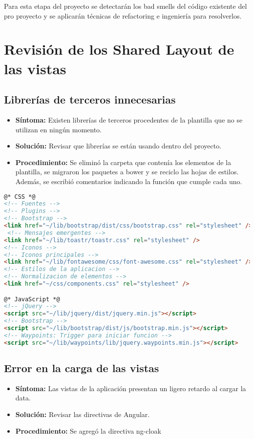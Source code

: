 Para esta etapa del proyecto se detectarán los bad smells del código existente del pro proyecto y se aplicarán técnicas de refactoring e ingeniería para resolverlos.

\section{Revisión de los Shared Layout de las vistas}
\subsection{Librerías de terceros innecesarias}
\begin{itemize}
	\item \textbf{Síntoma:} Existen librerías de terceros procedentes de la plantilla que no se utilizan en ningún momento.
	\item \textbf{Solución:} Revisar que librerías se están usando dentro del proyecto. 
	\item \textbf{Procedimiento:} Se eliminó la carpeta que contenía los elementos de la plantilla, se migraron los paquetes a bower y se reciclo las hojas de estilos. Además, se escribió comentarios indicando la función que cumple cada uno.
\end{itemize}

\begin{lstlisting}[language=html]
@* CSS *@
<!-- Fuentes -->
<!-- Plugins -->
<!-- Bootstrap -->
<link href="~/lib/bootstrap/dist/css/bootstrap.css" rel="stylesheet" /> 
 <!-- Mensajes emergentes -->
<link href="~/lib/toastr/toastr.css" rel="stylesheet" />
<!-- Iconos -->
<!-- Iconos principales -->
<link href="~/lib/fontawesome/css/font-awesome.css" rel="stylesheet" /> 
<!-- Estilos de la aplicacion -->
<!-- Normalizacion de elementos -->
<link href="~/css/components.css" rel="stylesheet" /> 

@* JavaScript *@
<!-- jQuery -->
<script src="~/lib/jquery/dist/jquery.min.js"></script> 
<!-- Bootstrap -->
<script src="~/lib/bootstrap/dist/js/bootstrap.min.js"></script> 
<!-- Waypoints: Trigger para iniciar funcion -->
<script src="~/lib/waypoints/lib/jquery.waypoints.min.js"></script> 
\end{lstlisting}

\subsection{Error en la carga de las vistas}
\begin{itemize}
	\item \textbf{Síntoma:} Las vistas de la aplicación presentan un ligero retardo al cargar la data.
	\item \textbf{Solución:} Revisar las directivas de Angular. 
	\item \textbf{Procedimiento:} Se agregó la directiva ng-cloak
\end{itemize}

